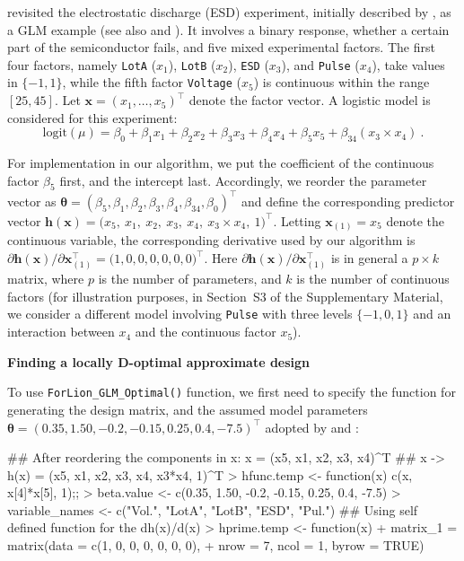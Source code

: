 \cite{lukemire2018} revisited the electrostatic discharge (ESD) experiment, initially described by \cite{whitman2006}, as a GLM example (see also \cite{huang2024forlion} and \cite{lin2025ew}). It involves a binary response, whether a certain part of the semiconductor fails, and five mixed experimental factors. The first four factors, namely \texttt{LotA} ($x_1$), \texttt{LotB} ($x_2$), \texttt{ESD} ($x_3$), and \texttt{Pulse} ($x_4$), take values in $\{-1,1\}$, while the fifth factor \texttt{Voltage} ($x_5$) is continuous within the range $[25, 45]$. Let $\mathbf{x}=(x_1,\ldots,x_5)^\top$ denote the factor vector.
A logistic model is considered for this experiment: 
\[
 \text{logit}(\mu)=\beta_0+\beta_1 x_1+\beta_2 x_2+\beta_3 x_3+\beta_4 x_4+\beta_5x_5+\beta_{34}(x_3 \times x_4) \ .
 \]

For implementation in our algorithm, we put the coefficient of the continuous factor $\beta_5$ first, and the intercept last. Accordingly, we reorder the parameter vector as $\boldsymbol \theta = (\beta_5, \beta_1, \beta_2, \beta_3, \beta_4, \beta_{34}, \beta_0)^\top$ and define the corresponding predictor vector
$
\mathbf{h}(\mathbf{x})=\bigl(x_5,\ x_1,\ x_2,\ x_3,\ x_4,\ x_3 \times x_4,\ 1\bigr)^\top
$.
Letting $\mathbf{x}_{(1)}=x_5$ denote the continuous variable, the corresponding derivative used by our algorithm is 
$
\partial \mathbf{h}(\mathbf{x})/\partial \mathbf{x}^\top_{(1)}=\bigl(1,0,0,0,0,0,0\bigr)^\top
$.
Here $\partial \mathbf{h}(\mathbf{x})/\partial \mathbf{x}_{(1)}^{\top}$ is in general a $p \times k$ matrix, where $p$ is the number of parameters, and $k$ is the number of continuous factors (for illustration purposes, in Section~S3 of the Supplementary Material, we consider a different model involving {\tt Pulse} with three levels $\{-1,0,1\}$ and an interaction between $x_4$ and the continuous factor $x_5$).

\medskip
\noindent
{\bf Finding a locally D-optimal approximate design}
\smallskip

\noindent
To use \verb|ForLion_GLM_Optimal()| function, we first need to specify the function for generating the design matrix, and the assumed model parameters $\boldsymbol{\theta} = (0.35, 1.50, -0.2, -0.15, 0.25, 0.4, -7.5)^\top$ adopted by \cite{lukemire2018} and \cite{huang2024forlion}:
\begin{example}
## After reordering the components in x: x = (x5, x1, x2, x3, x4)^T
## x -> h(x) = (x5, x1, x2, x3, x4, x3*x4, 1)^T
>  hfunc.temp <- function(x) {c(x, x[4]*x[5], 1);};  
>  beta.value <- c(0.35, 1.50, -0.2, -0.15, 0.25, 0.4, -7.5)
>  variable_names <- c("Vol.", "LotA", "LotB", "ESD", "Pul.")
## Using self defined function for the dh(x)/d(x)
> hprime.temp <- function(x){
+                matrix_1 = matrix(data = c(1, 0, 0, 0, 0, 0, 0),
+                                  nrow = 7, ncol = 1, byrow = TRUE)
}
\end{example}

